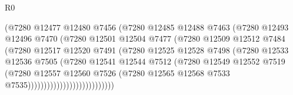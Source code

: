 \begin{lexlean}{R0}
\begin{coremodule}
                                  (@7280
                                    @12477
                                    @12480
                                    @7456
                                    (@7280
                                      @12485
                                      @12488
                                      @7463
                                      (@7280
                                        @12493
                                        @12496
                                        @7470
                                        (@7280
                                          @12501
                                          @12504
                                          @7477
                                          (@7280
                                            @12509
                                            @12512
                                            @7484
                                            (@7280
                                              @12517
                                              @12520
                                              @7491
                                              (@7280
                                                @12525
                                                @12528
                                                @7498
                                                (@7280
                                                  @12533
                                                  @12536
                                                  @7505
                                                  (@7280
                                                    @12541
                                                    @12544
                                                    @7512
                                                    (@7280
                                                      @12549
                                                      @12552
                                                      @7519
                                                      (@7280
                                                        @12557
                                                        @12560
                                                        @7526
                                                        (@7280
                                                          @12565
                                                          @12568
                                                          @7533
                                                          @7535)))))))))))))))))))))))))))

\end{coremodule}
\end{lexlean}
